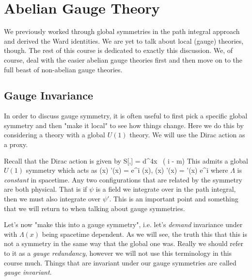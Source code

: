 \chapter{Abelian Gauge Theory}

We previously worked through global symmetries in the path integral approach and derived the Ward identities. We are yet to talk about local (gauge) theories, though. The rest of this course is dedicated to exactly this discussion. We, of course, deal with the easier abelian gauge theories first and then move on to the full beast of non-abelian gauge theories. 

\section{Gauge Invariance}

In order to discuss gauge symmetry, it is often useful to first pick a specific global symmetry and then "make it local" to see how things change. Here we do this by considering a theory with a global $U(1)$ theory. We will use the Dirac action as a proxy. 

Recall that the Dirac action is given by
\bse 
    S[\psi,\overline{\psi}] = \int d^4x \, \overline{\psi} \big( i\slashed{\p} - m\big) \psi
\ese 
This admits a global $U(1)$ symmetry which acts as
\be
\label{eqn:GlobalU(1)}
    \psi(x) \to \psi'(x) = e^{i\Lambda} \psi(x), \qand \overline{\psi}(x) \to \psi'(x) = \overline{\psi}'(x) e^{i\Lambda}
\ee 
where $\Lambda$ is \textit{constant} in spacetime. Any two configurations that are related by the symmetry are both physical. That is if $\psi$ is a field we integrate over in the path integral, then we must also integrate over $\psi'$. This is an important point and something that we will return to when talking about gauge symmetries. 

Let's now "make this into a gauge symmetry", i.e. let's \textit{demand} invariance under  with $\Lambda(x)$ being spacetime dependent. As we will see, the truth this that this is not a symmetry in the same way that the global one was. Really we should refer to it as a \textit{gauge redundancy}, however we will not use this terminology in this course much. Things that are invariant under our gauge symmetries are called \textit{gauge invariant}. 

